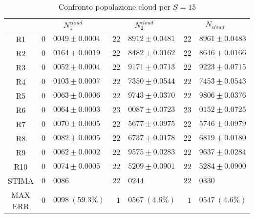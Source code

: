 \begin{table}[!h]
\begin{tabular}{c|r@{.}l|r@{.}l|r@{.}l}
& \multicolumn{2}{|c|}{$N_1^{cloud}$}
& \multicolumn{2}{|c|}{$N_2^{cloud}$}
& \multicolumn{2}{|c}{$N_{cloud}$} 
\\          
\hline
R1      & $0$&$0049 \pm 0.0004$ & $22$&$8912 \pm 0.0481$ & $22$&$8961 \pm 0.0483$ \\
R2      & $0$&$0164 \pm 0.0019$ & $22$&$8482 \pm 0.0162$ & $22$&$8646 \pm 0.0166$ \\
R3      & $0$&$0052 \pm 0.0004$ & $22$&$9171 \pm 0.0713$ & $22$&$9223 \pm 0.0715$ \\
R4      & $0$&$0103 \pm 0.0007$ & $22$&$7350 \pm 0.0544$ & $22$&$7453 \pm 0.0543$ \\
R5      & $0$&$0063 \pm 0.0006$ & $22$&$9743 \pm 0.0370$ & $22$&$9806 \pm 0.0376$ \\
R6      & $0$&$0064 \pm 0.0003$ & $23$&$0087 \pm 0.0723$ & $23$&$0152 \pm 0.0725$ \\
R7      & $0$&$0070 \pm 0.0005$ & $22$&$5677 \pm 0.0975$ & $22$&$5746 \pm 0.0979$ \\
R8      & $0$&$0082 \pm 0.0005$ & $22$&$6737 \pm 0.0178$ & $22$&$6819 \pm 0.0180$ \\
R9      & $0$&$0062 \pm 0.0002$ & $22$&$9575 \pm 0.0283$ & $22$&$9637 \pm 0.0284$ \\
R10     & $0$&$0074 \pm 0.0005$ & $22$&$5209 \pm 0.0901$ & $22$&$5284 \pm 0.0900$ \\
STIMA   & $0$&$0086$            & $22$&$0244$            & $22$&$0330$            \\
MAX ERR & $0$&$0098 \ (59.3\%)$ & $1$&$0567 \ (4.6\%)$   & $1$&$0547 \ (4.6\%)$       
\end{tabular}
\centering
\caption{Confronto popolazione cloud per $S=15$}
\label{tab:15_ncloud}
\end{table}
